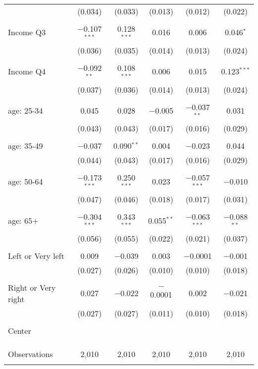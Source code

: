 \begin{tabular}{@{\extracolsep{5pt}}lccccc}
  & (0.034) & (0.033) & (0.013) & (0.012) & (0.022) \\ 
  & & & & & \\ 
 Income Q3 & $-$0.107$^{***}$ & 0.128$^{***}$ & 0.016 & 0.006 & 0.046$^{*}$ \\ 
  & (0.036) & (0.035) & (0.014) & (0.013) & (0.024) \\ 
  & & & & & \\ 
 Income Q4 & $-$0.092$^{**}$ & 0.108$^{***}$ & 0.006 & 0.015 & 0.123$^{***}$ \\ 
  & (0.037) & (0.036) & (0.014) & (0.013) & (0.024) \\ 
  & & & & & \\ 
 age: 25-34 & 0.045 & 0.028 & $-$0.005 & $-$0.037$^{**}$ & 0.031 \\ 
  & (0.043) & (0.043) & (0.017) & (0.016) & (0.029) \\ 
  & & & & & \\ 
 age: 35-49 & $-$0.037 & 0.090$^{**}$ & 0.004 & $-$0.023 & 0.044 \\ 
  & (0.044) & (0.043) & (0.017) & (0.016) & (0.029) \\ 
  & & & & & \\ 
 age: 50-64 & $-$0.173$^{***}$ & 0.250$^{***}$ & 0.023 & $-$0.057$^{***}$ & $-$0.010 \\ 
  & (0.047) & (0.046) & (0.018) & (0.017) & (0.031) \\ 
  & & & & & \\ 
 age: 65+ & $-$0.304$^{***}$ & 0.343$^{***}$ & 0.055$^{**}$ & $-$0.063$^{***}$ & $-$0.088$^{**}$ \\ 
  & (0.056) & (0.055) & (0.022) & (0.021) & (0.037) \\ 
  & & & & & \\ 
 Left or Very left & 0.009 & $-$0.039 & 0.003 & $-$0.0001 & $-$0.001 \\ 
  & (0.027) & (0.026) & (0.010) & (0.010) & (0.018) \\ 
  & & & & & \\ 
 Right or Very right & 0.027 & $-$0.022 & $-$0.0001 & 0.002 & $-$0.021 \\ 
  & (0.027) & (0.027) & (0.011) & (0.010) & (0.018) \\ 
  & & & & & \\ 
 Center &  &  &  &  &  \\ 
  &  &  &  &  &  \\ 
  & & & & & \\ 
\hline \\[-1.8ex] 

Observations & 2,010 & 2,010 & 2,010 & 2,010 & 2,010 \\ 
\hline 
\hline \\[-1.8ex] 
\end{tabular} 